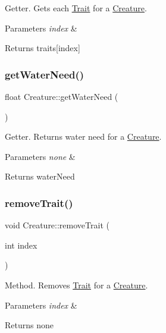 Getter. Gets each \hyperlink{class_trait}{Trait} for a \hyperlink{class_creature}{Creature}. 
\begin{DoxyParams}{Parameters}
{\em index} & \\
\hline
\end{DoxyParams}
\begin{DoxyReturn}{Returns}
traits\mbox{[}index\mbox{]} 
\end{DoxyReturn}
\mbox{\label{class_creature_afc61264e8b9d6e683aa73e225d9165ec}} 
\subsubsection{\texorpdfstring{get\+Water\+Need()}{getWaterNeed()}}
{\footnotesize\ttfamily float Creature\+::get\+Water\+Need (\begin{DoxyParamCaption}{ }\end{DoxyParamCaption})}

Getter. Returns water need for a \hyperlink{class_creature}{Creature}. 
\begin{DoxyParams}{Parameters}
{\em none} & \\
\hline
\end{DoxyParams}
\begin{DoxyReturn}{Returns}
water\+Need 
\end{DoxyReturn}
\mbox{\label{class_creature_a68390ce1e3db845b569edbb56d2a2e45}} 
\subsubsection{\texorpdfstring{remove\+Trait()}{removeTrait()}}
{\footnotesize\ttfamily void Creature\+::remove\+Trait (\begin{DoxyParamCaption}\item[{int}]{index }\end{DoxyParamCaption})}

Method. Removes \hyperlink{class_trait}{Trait} for a \hyperlink{class_creature}{Creature}. 
\begin{DoxyParams}{Parameters}
{\em index} & \\
\hline
\end{DoxyParams}
\begin{DoxyReturn}{Returns}
none 
\end{DoxyReturn}
\mbox{\label{class_creature_a53a6ce1c089f66f5d72d383918ac6c56}} 
